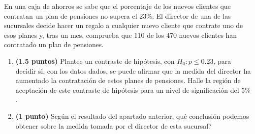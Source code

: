 
En una caja de ahorros se sabe que el porcentaje de los nuevos clientes que contratan un plan de pensiones no supera el $23\%$. El director de una de las sucursales decide hacer un regalo a cualquier nuevo cliente que contrate uno de esos planes y, tras un mes, comprueba que 110 de los 470 nuevos clientes han contratado un plan de pensiones.
\begin{enumerate}[label=\alph*)]
\item \textbf{(1.5 puntos)} Plantee un contraste de hipótesis, con $H_0:p\leq0.23$, para decidir si, con los datos dados, se puede afirmar que la medida del director ha aumentado la contratación de estos planes de pensiones. Halle la región de aceptación de este contraste de hipótesis para un nivel de significación del $5\%$.
\item \textbf{(1 punto)} Según el resultado del apartado anterior, \textquestiondown{}qué conclusión podemos obtener sobre la medida tomada por el director de esta sucursal?
\end{enumerate}
